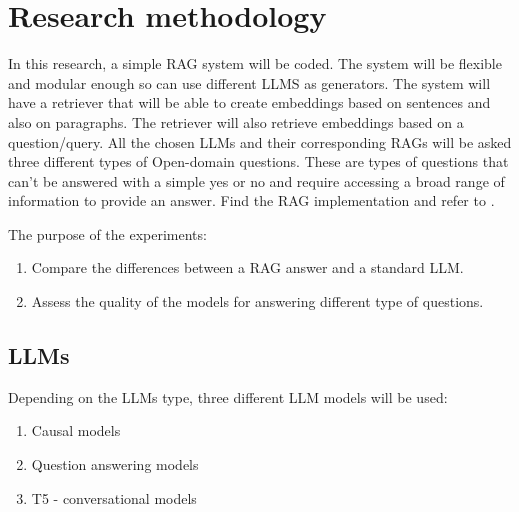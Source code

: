 \documentclass{wseas}
\begin{document}
\section{Research methodology}

In this research, a simple RAG system will be coded. The system will be
flexible and modular enough so can use different LLMS as generators. The
system will have a retriever that will be able to create embeddings
based on sentences and also on paragraphs. The retriever will also
retrieve embeddings based on a question/query. All the chosen LLMs and
their corresponding RAGs will be asked three different types of Open-domain
questions. These are types of questions that can't be answered with a simple 
yes or no and require accessing a broad range of information to provide an answer. 
Find the RAG implementation and refer to \cite{cite_github_solution}.

The purpose of the experiments: 
\begin{enumerate}
  \item Compare the differences between a RAG answer and a standard LLM.
  \item Assess the quality of the models for answering different type of questions.
\end{enumerate}

\subsection{LLMs}

Depending on the LLMs type, three different LLM models will be used:

\begin{enumerate}
\item
  Causal models
\item
  Question answering models
\item
  T5 - conversational models
\end{enumerate}
\end{document}
